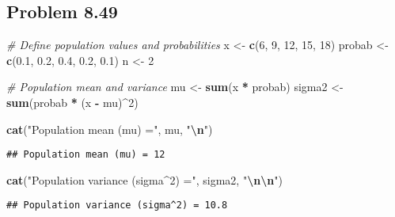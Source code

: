 \documentclass[
]{article}
\newenvironment{Shaded}{\begin{snugshade}}{\end{snugshade}}
\newcommand{\CommentTok}[1]{\textcolor[rgb]{0.56,0.35,0.01}{\textit{#1}}}
\newcommand{\DecValTok}[1]{\textcolor[rgb]{0.00,0.00,0.81}{#1}}
\newcommand{\FloatTok}[1]{\textcolor[rgb]{0.00,0.00,0.81}{#1}}
\newcommand{\FunctionTok}[1]{\textcolor[rgb]{0.13,0.29,0.53}{\textbf{#1}}}
\newcommand{\NormalTok}[1]{#1}
\newcommand{\OtherTok}[1]{\textcolor[rgb]{0.56,0.35,0.01}{#1}}
\newcommand{\SpecialCharTok}[1]{\textcolor[rgb]{0.81,0.36,0.00}{\textbf{#1}}}
\newcommand{\StringTok}[1]{\textcolor[rgb]{0.31,0.60,0.02}{#1}}
\begin{document}
\subsection{Problem 8.49}\label{problem-8.49}

\begin{Shaded}
\begin{Highlighting}[]
\CommentTok{\# Define population values and probabilities}
\NormalTok{x }\OtherTok{\textless{}{-}} \FunctionTok{c}\NormalTok{(}\DecValTok{6}\NormalTok{, }\DecValTok{9}\NormalTok{, }\DecValTok{12}\NormalTok{, }\DecValTok{15}\NormalTok{, }\DecValTok{18}\NormalTok{)}
\NormalTok{probab }\OtherTok{\textless{}{-}} \FunctionTok{c}\NormalTok{(}\FloatTok{0.1}\NormalTok{, }\FloatTok{0.2}\NormalTok{, }\FloatTok{0.4}\NormalTok{, }\FloatTok{0.2}\NormalTok{, }\FloatTok{0.1}\NormalTok{)}
\NormalTok{n }\OtherTok{\textless{}{-}} \DecValTok{2}

\CommentTok{\# Population mean and variance}
\NormalTok{mu }\OtherTok{\textless{}{-}} \FunctionTok{sum}\NormalTok{(x }\SpecialCharTok{*}\NormalTok{ probab)}
\NormalTok{sigma2 }\OtherTok{\textless{}{-}} \FunctionTok{sum}\NormalTok{(probab }\SpecialCharTok{*}\NormalTok{ (x }\SpecialCharTok{{-}}\NormalTok{ mu)}\SpecialCharTok{\^{}}\DecValTok{2}\NormalTok{)}

\FunctionTok{cat}\NormalTok{(}\StringTok{"Population mean (mu) ="}\NormalTok{, mu, }\StringTok{"}\SpecialCharTok{\textbackslash{}n}\StringTok{"}\NormalTok{)}
\end{Highlighting}
\end{Shaded}

\begin{verbatim}
## Population mean (mu) = 12
\end{verbatim}

\begin{Shaded}
\begin{Highlighting}[]
\FunctionTok{cat}\NormalTok{(}\StringTok{"Population variance (sigma\^{}2) ="}\NormalTok{, sigma2, }\StringTok{"}\SpecialCharTok{\textbackslash{}n\textbackslash{}n}\StringTok{"}\NormalTok{)}
\end{Highlighting}
\end{Shaded}

\begin{verbatim}
## Population variance (sigma^2) = 10.8
\end{verbatim}
\end{document}
